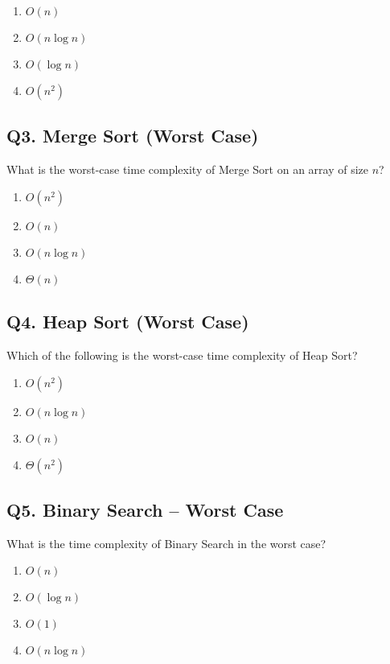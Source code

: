 \begin{enumerate}[label=(\alph*)]
    \item \(O(n)\) \quad
    \item \(O(n \log n)\) \quad
    \item \(O(\log n)\) \quad
    \item \(O(n^2)\)
\end{enumerate}


\subsection*{Q3. Merge Sort (Worst Case)}
What is the worst-case time complexity of Merge Sort on an array of size \(n\)?

\begin{enumerate}[label=(\alph*)]
    \item \(O(n^2)\) \quad
    \item \(O(n)\) \quad
    \item \(O(n \log n)\) \quad
    \item \(\Theta(n)\)
\end{enumerate}


\subsection*{Q4. Heap Sort (Worst Case)}
Which of the following is the worst-case time complexity of Heap Sort?

\begin{enumerate}[label=(\alph*)]
    \item \(O(n^2)\) \quad
    \item \(O(n \log n)\) \quad
    \item \(O(n)\) \quad
    \item \(\Theta(n^2)\)
\end{enumerate}


\subsection*{Q5. Binary Search – Worst Case}
What is the time complexity of Binary Search in the worst case?

\begin{enumerate}[label=(\alph*)]
    \item \(O(n)\) \quad
    \item \(O(\log n)\) \quad
    \item \(O(1)\) \quad
    \item \(O(n \log n)\)
\end{enumerate}


